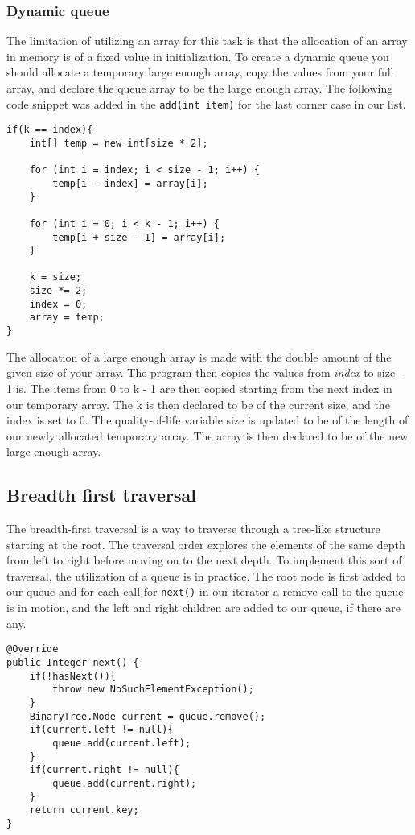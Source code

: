 \documentclass[a4paper,11pt]{article}
\begin{document}
        \subsubsection*{Dynamic queue}

            The limitation of utilizing an array for this task is that the allocation of an array in memory is of a fixed value in initialization. To create a dynamic queue you should allocate a temporary large enough array, copy the values from your full array, and declare the queue array to be the large enough array. The following code snippet was added in the \texttt{add(int item)} for the last corner case in our list.
            \begin{verbatim}
if(k == index){
    int[] temp = new int[size * 2];
    
    for (int i = index; i < size - 1; i++) {
        temp[i - index] = array[i];
    }
    
    for (int i = 0; i < k - 1; i++) {
        temp[i + size - 1] = array[i]; 
    }
    
    k = size;
    size *= 2;
    index = 0;
    array = temp;
}
            \end{verbatim}
            The allocation of a large enough array is made with the double amount of the given size of your array. The program then copies the values from \textit{index} to size - 1 is. The items from 0 to k - 1 are then copied starting from the next index in our temporary array. The k is then declared to be of the current size, and the index is set to 0. The quality-of-life variable size is updated to be of the length of our newly allocated temporary array. The array is then declared to be of the new large enough array.
    \subsection*{Breadth first traversal}

        The breadth-first traversal is a way to traverse through a tree-like structure starting at the root. The traversal order explores the elements of the same depth from left to right before moving on to the next depth. To implement this sort of traversal, the utilization of a queue is in practice. The root node is first added to our queue and for each call for \texttt{next()} in our iterator a remove call to the queue is in motion, and the left and right children are added to our queue, if there are any.

        \begin{verbatim}
@Override
public Integer next() { 
    if(!hasNext()){
        throw new NoSuchElementException();
    }
    BinaryTree.Node current = queue.remove();
    if(current.left != null){
        queue.add(current.left);
    }
    if(current.right != null){
        queue.add(current.right);
    }
    return current.key;
}
        \end{verbatim}
        
\end{document}
